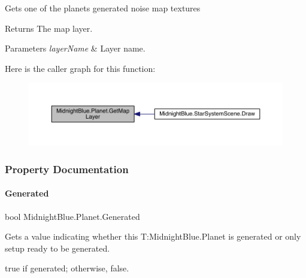 Gets one of the planets generated noise map textures 

\begin{DoxyReturn}{Returns}
The map layer.
\end{DoxyReturn}

\begin{DoxyParams}{Parameters}
{\em layer\+Name} & Layer name.\\
\hline
\end{DoxyParams}
Here is the caller graph for this function\+:\nopagebreak
\begin{figure}[H]
\begin{center}
\leavevmode
\includegraphics[width=350pt]{class_midnight_blue_1_1_planet_ac3b3442ad8f168a8d9151386592eb270_icgraph}
\end{center}
\end{figure}


\subsubsection{Property Documentation}
\hypertarget{class_midnight_blue_1_1_planet_a525e5089a0a522069f10302d9ece26e1}{}\label{class_midnight_blue_1_1_planet_a525e5089a0a522069f10302d9ece26e1} 
\paragraph{\texorpdfstring{Generated}{Generated}}
{\footnotesize\ttfamily bool Midnight\+Blue.\+Planet.\+Generated\hspace{0.3cm}{\ttfamily [get]}}



Gets a value indicating whether this T\+:\+Midnight\+Blue.\+Planet is generated or only setup ready to be generated. 

{\ttfamily true} if generated; otherwise, {\ttfamily false}.\hypertarget{class_midnight_blue_1_1_planet_a064b1e2b9aa83abac4065f4a7e0c5e58}{}\label{class_midnight_blue_1_1_planet_a064b1e2b9aa83abac4065f4a7e0c5e58} 
